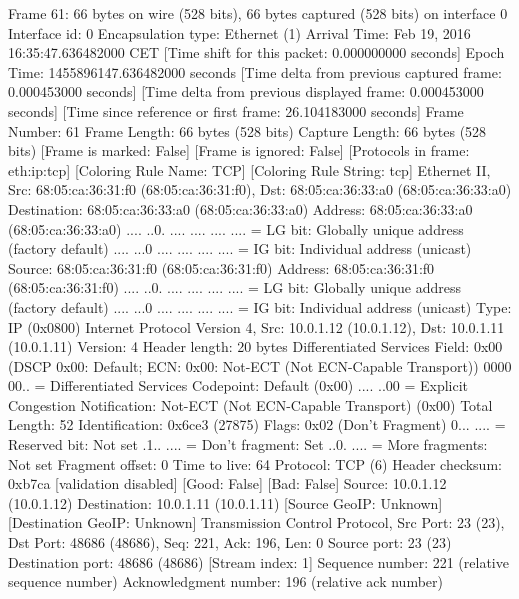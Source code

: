 Frame 61: 66 bytes on wire (528 bits), 66 bytes captured (528 bits) on interface 0
    Interface id: 0
    Encapsulation type: Ethernet (1)
    Arrival Time: Feb 19, 2016 16:35:47.636482000 CET
    [Time shift for this packet: 0.000000000 seconds]
    Epoch Time: 1455896147.636482000 seconds
    [Time delta from previous captured frame: 0.000453000 seconds]
    [Time delta from previous displayed frame: 0.000453000 seconds]
    [Time since reference or first frame: 26.104183000 seconds]
    Frame Number: 61
    Frame Length: 66 bytes (528 bits)
    Capture Length: 66 bytes (528 bits)
    [Frame is marked: False]
    [Frame is ignored: False]
    [Protocols in frame: eth:ip:tcp]
    [Coloring Rule Name: TCP]
    [Coloring Rule String: tcp]
Ethernet II, Src: 68:05:ca:36:31:f0 (68:05:ca:36:31:f0), Dst: 68:05:ca:36:33:a0 (68:05:ca:36:33:a0)
    Destination: 68:05:ca:36:33:a0 (68:05:ca:36:33:a0)
        Address: 68:05:ca:36:33:a0 (68:05:ca:36:33:a0)
        .... ..0. .... .... .... .... = LG bit: Globally unique address (factory default)
        .... ...0 .... .... .... .... = IG bit: Individual address (unicast)
    Source: 68:05:ca:36:31:f0 (68:05:ca:36:31:f0)
        Address: 68:05:ca:36:31:f0 (68:05:ca:36:31:f0)
        .... ..0. .... .... .... .... = LG bit: Globally unique address (factory default)
        .... ...0 .... .... .... .... = IG bit: Individual address (unicast)
    Type: IP (0x0800)
Internet Protocol Version 4, Src: 10.0.1.12 (10.0.1.12), Dst: 10.0.1.11 (10.0.1.11)
    Version: 4
    Header length: 20 bytes
    Differentiated Services Field: 0x00 (DSCP 0x00: Default; ECN: 0x00: Not-ECT (Not ECN-Capable Transport))
        0000 00.. = Differentiated Services Codepoint: Default (0x00)
        .... ..00 = Explicit Congestion Notification: Not-ECT (Not ECN-Capable Transport) (0x00)
    Total Length: 52
    Identification: 0x6ce3 (27875)
    Flags: 0x02 (Don't Fragment)
        0... .... = Reserved bit: Not set
        .1.. .... = Don't fragment: Set
        ..0. .... = More fragments: Not set
    Fragment offset: 0
    Time to live: 64
    Protocol: TCP (6)
    Header checksum: 0xb7ca [validation disabled]
        [Good: False]
        [Bad: False]
    Source: 10.0.1.12 (10.0.1.12)
    Destination: 10.0.1.11 (10.0.1.11)
    [Source GeoIP: Unknown]
    [Destination GeoIP: Unknown]
Transmission Control Protocol, Src Port: 23 (23), Dst Port: 48686 (48686), Seq: 221, Ack: 196, Len: 0
    Source port: 23 (23)
    Destination port: 48686 (48686)
    [Stream index: 1]
    Sequence number: 221    (relative sequence number)
    Acknowledgment number: 196    (relative ack number)
